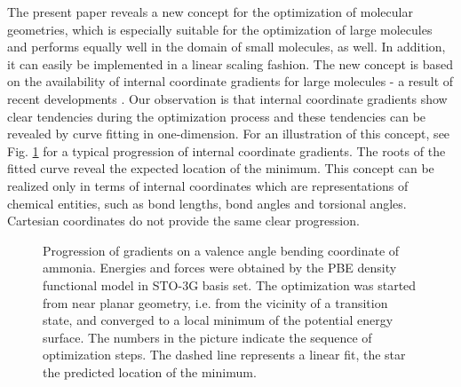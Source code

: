 \documentclass[prl,aps,twocolumn,showpacs,twocolumngrid,superbib]{revtex4}
\begin{document}
The present paper reveals a new concept for the optimization of
molecular geometries, which is especially suitable for the
optimization of large molecules and performs equally well in the
domain of small molecules, as well. In addition, 
it can easily be implemented in a linear scaling fashion.
The new concept is based on the availability of internal coordinate
gradients for large molecules - a result of recent developments
\cite{paizs_coordtrf1,nemeth_coordtrf1,paizs_coordtrf2,nemeth_coordtrf2,billeter_coordtrf,andzelm_coordtrf,kudin_coordtrf}.
Our observation is that internal coordinate gradients show clear
tendencies during the optimization process and these tendencies 
can be revealed
by curve fitting in one-dimension. 
For an illustration of this concept,
see Fig. \ref{NH3outp6} for a typical progression of internal coordinate
gradients. The roots of the fitted curve reveal the expected location
of the minimum. This concept can be realized only in terms of
internal coordinates which are representations of chemical entities, such as
bond lengths, bond angles and torsional angles. Cartesian
coordinates do not provide the same clear progression.
\begin{figure}[h]
\caption{
\small  
Progression of gradients on a valence angle bending coordinate of
ammonia. Energies and forces were obtained by the PBE 
density functional model in STO-3G basis set.
The optimization was started from near planar geometry, i.e.
from the vicinity of a transition state, and converged to a local 
minimum of the potential energy surface. The numbers in the picture
indicate the sequence of optimization steps. The dashed line represents
a linear fit, the star the predicted location of the minimum.
\label{NH3outp6}
}
\end{figure}
\end{document}
